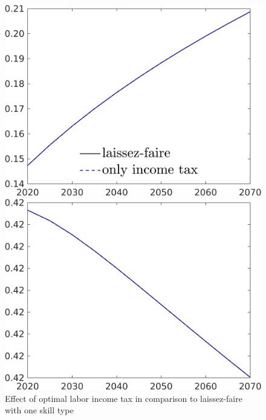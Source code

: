 \begin{figure}[h!!]
	\centering
	\caption{Effect of optimal labor income tax in comparison to laissez-faire with one skill type}\label{fig:LF_vs_onlytaul_nsk}
		\begin{minipage}[]{0.32\textwidth}
		\includegraphics[width=1\textwidth]{../../codding_model/own_basedOnFried/optimalPol_190722_tidiedUp/figures/all_10Aout22/CountTaul_modnsk_target_GFF_spillover0_sep1_extern0_PV1_etaa0.79_lgd1.png}
	\end{minipage}
	\begin{minipage}[]{0.32\textwidth}
	\includegraphics[width=1\textwidth]{../../codding_model/own_basedOnFried/optimalPol_190722_tidiedUp/figures/all_10Aout22/CountTaul_modnsk_target_EY_spillover0_sep1_extern0_PV1_etaa0.79_lgd0.png}

\end{minipage}
\end{figure}
